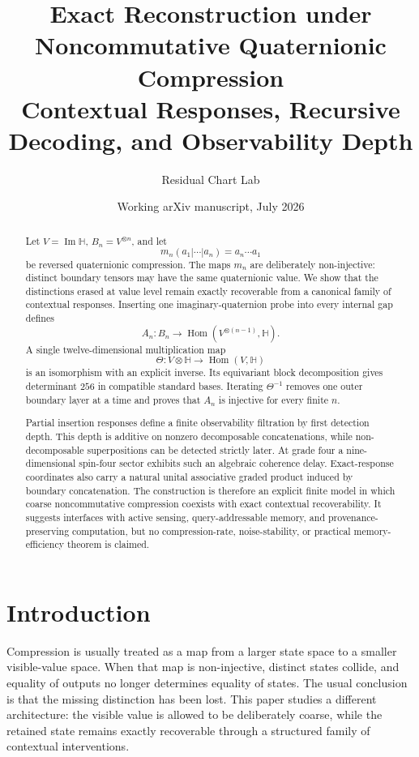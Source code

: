 \documentclass[11pt]{article}
\title{Exact Reconstruction under Noncommutative Quaternionic Compression\\
\large Contextual Responses, Recursive Decoding, and Observability Depth}
\author{Residual Chart Lab}
\date{Working arXiv manuscript, July 2026}
\theoremstyle{definition}
\theoremstyle{remark}
\newcommand{\Hom}{\operatorname{Hom}}
\begin{document}
\maketitle

\begin{abstract}
Let $V=\operatorname{Im}\mathbb H$, $B_n=V^{\otimes n}$, and let
\[
  m_n(a_1|\cdots|a_n)=a_n\cdots a_1
\]
be reversed quaternionic compression.  The maps $m_n$ are deliberately non-injective: distinct boundary tensors may have the same quaternionic value.  We show that the distinctions erased at value level remain exactly recoverable from a canonical family of contextual responses.  Inserting one imaginary-quaternion probe into every internal gap defines
\[
  A_n:B_n\longrightarrow \Hom(V^{\otimes(n-1)},\mathbb H).
\]
A single twelve-dimensional multiplication map
\[
  \Theta:V\otimes\mathbb H\longrightarrow\Hom(V,\mathbb H)
\]
is an isomorphism with an explicit inverse.  Its equivariant block decomposition gives determinant $256$ in compatible standard bases.  Iterating $\Theta^{-1}$ removes one outer boundary layer at a time and proves that $A_n$ is injective for every finite $n$.

Partial insertion responses define a finite observability filtration by first detection depth.  This depth is additive on nonzero decomposable concatenations, while non-decomposable superpositions can be detected strictly later.  At grade four a nine-dimensional spin-four sector exhibits such an algebraic coherence delay.  Exact-response coordinates also carry a natural unital associative graded product induced by boundary concatenation.  The construction is therefore an explicit finite model in which coarse noncommutative compression coexists with exact contextual recoverability.  It suggests interfaces with active sensing, query-addressable memory, and provenance-preserving computation, but no compression-rate, noise-stability, or practical memory-efficiency theorem is claimed.
\end{abstract}

\section{Introduction}

Compression is usually treated as a map from a larger state space to a smaller visible-value space.  When that map is non-injective, distinct states collide, and equality of outputs no longer determines equality of states.  The usual conclusion is that the missing distinction has been lost.  This paper studies a different architecture: the visible value is allowed to be deliberately coarse, while the retained state remains exactly recoverable through a structured family of contextual interventions.
\end{document}
